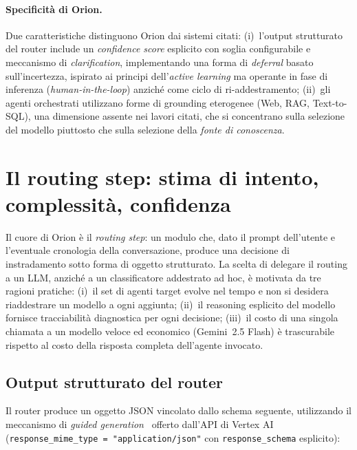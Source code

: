 \paragraph{Specificità di Orion.} Due caratteristiche distinguono Orion dai sistemi citati: (i)~l'output 
strutturato del router include un \emph{confidence score} esplicito con soglia configurabile e meccanismo di \emph{clarification}, 
implementando una forma di \emph{deferral} basato sull'incertezza, ispirato ai principi dell'\emph{active learning} 
ma operante in fase di inferenza (\emph{human-in-the-loop}) anziché come ciclo di ri-addestramento; (ii)~gli agenti orchestrati utilizzano forme di 
grounding eterogenee (Web, RAG, Text-to-SQL), una dimensione assente nei lavori citati, 
che si concentrano sulla selezione del modello piuttosto che sulla selezione della \emph{fonte di conoscenza}.

\section{Il routing step: stima di intento, complessità, confidenza}
\label{sec:orion-routing}

Il cuore di Orion è il \emph{routing step}: un modulo che, 
dato il prompt dell'utente e l'eventuale cronologia della conversazione, 
produce una decisione di instradamento sotto forma di oggetto strutturato. 
La scelta di delegare il routing a un LLM, anziché a un classificatore addestrato ad hoc, 
è motivata da tre ragioni pratiche: (i)~il set di agenti target evolve nel tempo 
 e non si desidera riaddestrare un modello a ogni aggiunta; (ii)~il reasoning esplicito del modello 
 fornisce tracciabilità diagnostica per ogni decisione; (iii)~il costo di una singola chiamata 
 a un modello veloce ed economico (Gemini~2.5 Flash) è trascurabile rispetto al costo 
 della risposta completa dell'agente invocato.

\subsection{Output strutturato del router}
\label{subsec:orion-output-strutturato}

Il router produce un oggetto JSON vincolato dallo schema seguente, 
utilizzando il meccanismo di \emph{guided generation}~\cite{willard2023outlines} offerto dall'API di 
Vertex AI (\texttt{response\_mime\_type = "application/json"} con \texttt{response\_schema} esplicito):

